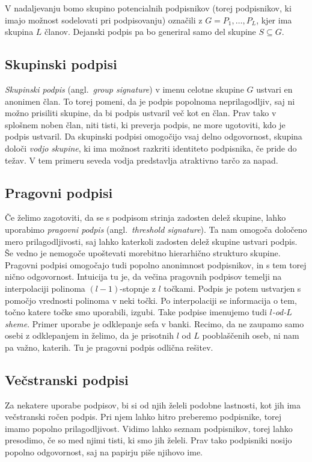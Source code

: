 \documentclass[isrm2, tisk]{fmfdelo}
\begin{document}
V nadaljevanju bomo skupino potencialnih podpisnikov (torej podpisnikov, ki imajo možnost sodelovati pri 
podpisovanju) označili z $G = P_1, \dots, P_L$, kjer ima skupina $L$ članov. Dejanski podpis pa bo 
generiral samo del skupine $S \subseteq G$.

\subsection{Skupinski podpisi}
\textit{Skupinski podpis} (angl.\ \textit{group signature}) v imenu celotne skupine $G$ ustvari en 
anonimen član. To torej pomeni, da je podpis popolnoma neprilagodljiv, saj ni možno prisiliti skupine,
da bi podpis ustvaril več kot en član. Prav tako v splošnem noben član, niti tisti, ki preverja podpis,
ne more ugotoviti, kdo je podpis ustvaril. Da skupinski podpisi omogočijo vsaj delno odgovornost, 
skupina določi \textit{vodjo skupine}, ki ima možnost razkriti identiteto podpisnika, če pride do 
težav. V tem primeru seveda vodja predstavlja atraktivno tarčo za napad.

\subsection{Pragovni podpisi}
Če želimo zagotoviti, da se s podpisom strinja zadosten delež skupine, lahko uporabimo \textit{pragovni 
podpis} (angl.\ \textit{threshold signature}). Ta nam omogoča določeno mero prilagodljivosti, saj lahko 
katerkoli zadosten delež skupine ustvari podpis. Še vedno je nemogoče upoštevati morebitno hierarhično
strukturo skupine. Pragovni podpisi omogočajo tudi popolno anonimnost podpisnikov, in s tem torej 
nično odgovornost. Intuicija tu je, da večina pragovnih podpisov temelji na interpolaciji polinoma 
$(l - 1)$-stopnje z $l$ točkami. Podpis je potem ustvarjen s pomočjo vrednosti polinoma v neki točki. 
Po interpolaciji se informacija o tem, točno katere točke smo uporabili, izgubi. Take podpise imenujemo 
tudi \textit{$l$-od-$L$ sheme}. Primer uporabe je odklepanje sefa v banki. Recimo, da ne zaupamo samo 
osebi z odklepanjem in želimo, da je prisotnih $l$ od $L$ pooblaščenih oseb, ni nam pa važno, katerih. 
Tu je pragovni podpis odlična rešitev.

\subsection{Večstranski podpisi}
\label{sec:multisig}
Za nekatere uporabe podpisov, bi si od njih želeli podobne lastnosti, kot jih ima večstranski ročen podpis. 
Pri njem lahko hitro preberemo podpisnike, torej imamo popolno prilagodljivost. Vidimo lahko seznam 
podpisnikov, torej lahko presodimo, če so med njimi tisti, ki smo jih želeli. Prav tako podpisniki nosijo 
popolno odgovornost, saj na papirju piše njihovo ime. 
\end{document}
